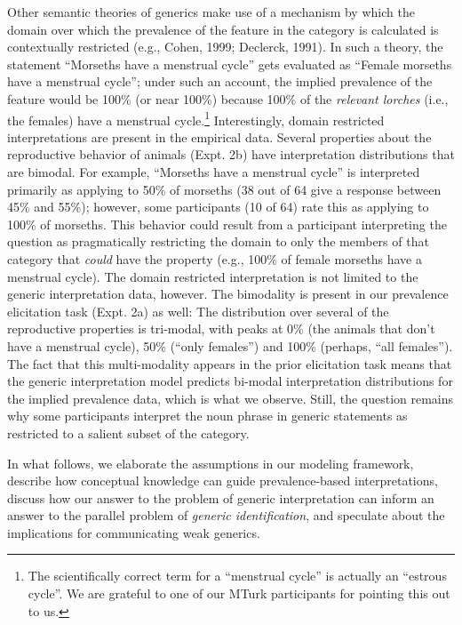 \documentclass[floatsintext,doc]{apa6}
\let\rmarkdownfootnote\footnote%
\def\footnote{\protect\rmarkdownfootnote}
\begin{document}
Other semantic theories of generics make use of a mechanism by which the domain over which the prevalence of the feature in the category is calculated is contextually restricted (e.g., Cohen, 1999; Declerck, 1991).
In such a theory, the statement \enquote{Morseths have a menstrual cycle} gets evaluated as \enquote{Female morseths have a menstrual cycle}; under such an account, the implied prevalence of the feature would be 100\% (or near 100\%) because 100\% of the \emph{relevant lorches} (i.e., the females) have a menstrual cycle.\footnote{The scientifically correct term for a \enquote{menstrual cycle} is actually an \enquote{estrous cycle}. We are grateful to one of our MTurk participants for pointing this out to us. }
Interestingly, domain restricted interpretations are present in the empirical data.
Several properties about the reproductive behavior of animals (Expt. 2b) have interpretation distributions that are bimodal.
For example, \enquote{Morseths have a menstrual cycle} is interpreted primarily as applying to 50\% of morseths (38 out of 64 give a response between 45\% and 55\%); however, some participants (10 of 64) rate this as applying to 100\% of morseths.
This behavior could result from a participant interpreting the question as pragmatically restricting the domain to only the members of that category that \emph{could} have the property (e.g., 100\% of female morseths have a menstrual cycle).
The domain restricted interpretation is not limited to the generic interpretation data, however.
The bimodality is present in our prevalence elicitation task (Expt. 2a) as well: The distribution over several of the reproductive properties is tri-modal, with peaks at 0\% (the animals that don't have a menstrual cycle), 50\% (\enquote{only females}) and 100\% (perhaps, \enquote{all females}).
The fact that this multi-modality appears in the prior elicitation task means that the generic interpretation model predicts bi-modal interpretation distributions for the implied prevalence data, which is what we observe.
Still, the question remains why some participants interpret the noun phrase in generic statements as restricted to a salient subset of the category.

In what follows, we elaborate the assumptions in our modeling framework, describe how conceptual knowledge can guide prevalence-based interpretations, discuss how our answer to the problem of generic interpretation can inform an answer to the parallel problem of \emph{generic identification}, and speculate about the implications for communicating weak generics.
\end{document}
